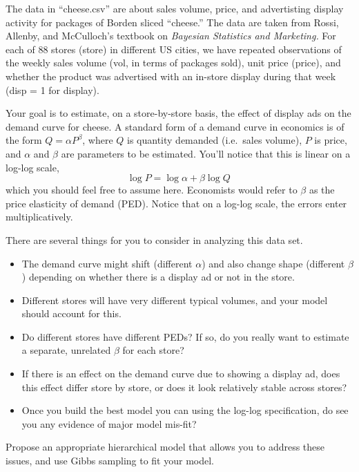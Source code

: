 \documentclass{article}
\begin{document}
The data in ``cheese.csv'' are about sales volume, price, and advertisting display activity for packages of Borden sliced ``cheese.'' The data are taken from Rossi, Allenby, and McCulloch's textbook on \textit{Bayesian Statistics and Marketing.} For each of 88 stores (store) in different US cities, we have repeated observations of the weekly sales volume (vol, in terms of packages sold), unit price (price), and whether the product was advertised with an in-store display during that week (disp = 1 for display).

Your goal is to estimate, on a store-by-store basis, the effect of display ads on the demand curve for cheese.  A standard form of a demand curve in economics is of the form $Q = \alpha P^\beta$, where $Q$ is quantity demanded (i.e.~sales volume), $P$ is price, and $\alpha$ and $\beta$ are parameters to be estimated.  You'll notice that this is linear on a log-log scale,
$$
\log P = \log \alpha + \beta \log Q \,
$$
which you should feel free to assume here.  Economists would refer to $\beta$ as the price elasticity of demand (PED).  Notice that on a log-log scale, the errors enter multiplicatively.

There are several things for you to consider in analyzing this data set.
\begin{itemize}
\item The demand curve might shift (different $\alpha$) and also change shape (different $\beta$) depending on whether there is a display ad or not in the store.
\item Different stores will have very different typical volumes, and your model should account for this.
\item Do different stores have different PEDs?  If so, do you really want to estimate a separate, unrelated $\beta$ for each store?
\item If there is an effect on the demand curve due to showing a display ad, does this effect differ store by store, or does it look relatively stable across stores?
\item Once you build the best model you can using the log-log specification, do see you any evidence of major model mis-fit?
\end{itemize}
Propose an appropriate hierarchical model that allows you to address these issues, and use Gibbs sampling to fit your model.
\end{document}
